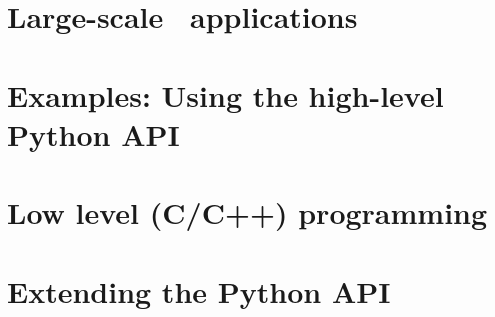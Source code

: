 \documentclass[11pt,fleqn]{book}
\begin{document}
 

 \thispagestyle{empty}
 \newpage
 \cleardoublepage 

 \pagestyle{plain}
 

 \cleardoublepage 
 
 \tableofcontents

 \newpage

 \cleardoublepage 

 \pagestyle{plain}
 
 
 



 \part{Large-scale \Peano\ applications}
 \newpage
 
 \newpage
 
 \newpage
 


 \part{Examples: Using the high-level Python API}
 \newpage
 
 \newpage
 

 
 
 \part{Low level (C/C++) programming}
 
 \newpage
 
 \newpage
 
 \newpage
 
 \newpage
 




%   
% 
% 
 \part{Extending the Python API}
 \newpage
 
 
\end{document}
